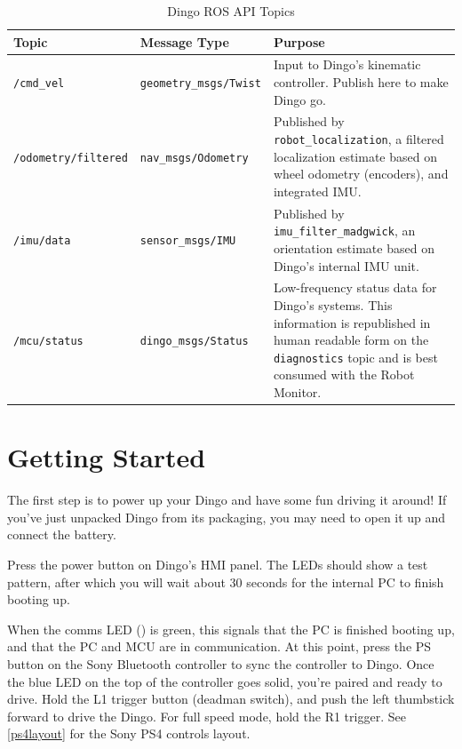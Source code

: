 \documentclass[]{clearpath-latex/clearpath-manual}
\begin{document}
\bgroup
\begin{table}[htp]
\begin{tabular}{  l  l  p{7cm} }
\hline
Topic & Message Type & Purpose \\ \hline

\lstinline!/cmd_vel! & \lstinline!geometry_msgs/Twist! &
Input to Dingo's kinematic controller. Publish here to make Dingo go. \\ \hline
\lstinline!/odometry/filtered! & \lstinline!nav_msgs/Odometry! &
Published by \lstinline!robot_localization!, a filtered localization estimate based
on wheel odometry (encoders), and integrated IMU. \\ \hline

\lstinline!/imu/data! & \lstinline!sensor_msgs/IMU! &
Published by \lstinline!imu_filter_madgwick!, an orientation estimate based on Dingo's
internal IMU unit. \\ \hline

\lstinline!/mcu/status! & \lstinline!dingo_msgs/Status! &
Low-frequency status data for Dingo's systems. This information is republished in human
readable form on the \lstinline!diagnostics! topic and is best consumed with the Robot
Monitor. \\ \hline
\end{tabular}
\caption{Dingo ROS API Topics}
\label{table:rosapi}
\end{table}
\egroup

\section{Getting Started}

The first step is to power up your Dingo and have some fun driving it around! If you've
just unpacked Dingo from its packaging, you may need to open it up and connect the
battery.

Press the power button  on
Dingo's HMI panel. The LEDs should show a test pattern, after which you will wait about 30
seconds for the internal PC to finish booting up.

When the comms LED () is
green, this signals that the PC is finished booting up, and that the PC and MCU are in
communication. At this point,
press the PS button on the Sony Bluetooth controller to sync the controller to Dingo. Once
the blue LED on the top of the controller goes solid, you're paired and ready to drive. Hold the L1 trigger
button (deadman switch), and push the left thumbstick forward to drive the Dingo. For full speed mode, hold the R1 trigger.  See \autoref{ps4layout} for the Sony PS4 controls layout.
\end{document}
